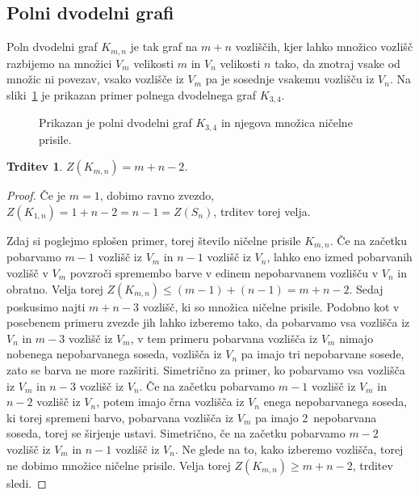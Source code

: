 \documentclass[12pt,a4paper,twoside]{article}
\theoremstyle{definition} %
\theoremstyle{plain} %
\newtheorem{trditev}[definicija]{Trditev}
\numberwithin{equation}{section}  %
\begin{document}
\subsection{Polni dvodelni grafi}
Poln dvodelni graf $K_{m,n}$ je tak graf na $m+n$ vozliščih, kjer lahko množico vozlišč razbijemo na množici $V_m$ velikosti $m$ in $V_n$ velikosti $n$ tako, da znotraj vsake od množic ni povezav, vsako vozlišče iz $V_m$ pa je sosednje vsakemu vozlišču iz $V_n$. Na sliki~\ref{fig:polni-dvodelni-graf} je prikazan primer polnega dvodelnega graf $K_{3,4}$.
\begin{figure}[h]
    \centering
    \caption{Prikazan je polni dvodelni graf $K_{3,4}$ in njegova množica ničelne prisile.}
    \label{fig:polni-dvodelni-graf}
\end{figure}
\begin{trditev}
    \label{trd:polni-dvodelni-graf}
    $Z(K_{m,n}) = m + n - 2$.
\end{trditev}
\begin{proof}
    Če je $m=1$, dobimo ravno zvezdo, $Z(K_{1,n}) = 1 + n - 2 = n - 1 = Z(S_n)$, trditev torej velja.
    
    Zdaj si poglejmo splošen primer, torej število ničelne prisile $K_{m,n}$. Če na začetku pobarvamo $m-1$ vozlišč iz $V_m$ in $n-1$ vozlišč iz $V_n$, lahko eno izmed pobarvanih vozlišč v $V_m$ povzroči spremembo barve v edinem nepobarvanem vozlišču v $V_n$ in obratno. Velja torej $Z(K_{m,n}) \leq (m - 1) + (n - 1) = m + n -2$. Sedaj poskusimo najti $m + n - 3$ vozlišč, ki so množica ničelne prisile. Podobno kot v posebenem primeru zvezde jih lahko izberemo tako, da pobarvamo vsa vozlišča iz $V_n$ in $m-3$ vozlišč iz $V_m$, v tem primeru pobarvana vozlišča iz $V_m$ nimajo nobenega nepobarvanega soseda, vozlišča iz $V_n$ pa imajo tri nepobarvane sosede, zato se barva ne more razširiti. Simetrično za primer, ko pobarvamo vsa vozlišča iz $V_m$ in $n-3$ vozlišč iz $V_n$. Če na začetku pobarvamo $m-1$ vozlišč iz $V_m$ in $n-2$ vozlišč iz $V_n$, potem imajo črna vozlišča iz $V_n$ enega nepobarvanega soseda, ki torej spremeni barvo, pobarvana vozlišča iz $V_m$ pa imajo 2~nepobarvana soseda, torej se širjenje ustavi. Simetrično, če na začetku pobarvamo $m-2$ vozlišč iz $V_m$ in $n-1$ vozlišč iz $V_n$. Ne glede na to, kako izberemo vozlišča, torej ne dobimo množice ničelne prisile. Velja torej $Z(K_{m,n}) \geq m + n - 2$, trditev sledi.
\end{proof}
\end{document}
